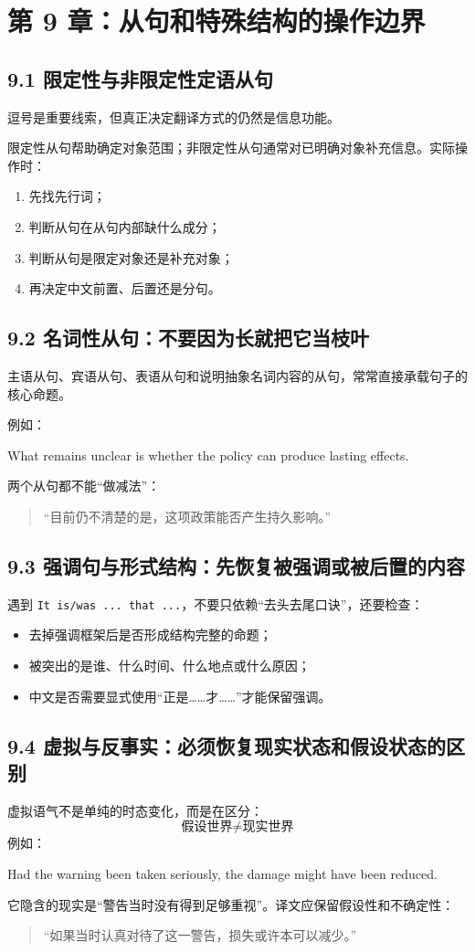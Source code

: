 \documentclass[11pt,a4paper]{ctexart}
\begin{document}
\section{第 9 章：从句和特殊结构的操作边界}

\subsection{9.1 限定性与非限定性定语从句}
逗号是重要线索，但真正决定翻译方式的仍然是信息功能。

限定性从句帮助确定对象范围；非限定性从句通常对已明确对象补充信息。实际操作时：
\begin{enumerate}
  \item 先找先行词；
  \item 判断从句在从句内部缺什么成分；
  \item 判断从句是限定对象还是补充对象；
  \item 再决定中文前置、后置还是分句。
\end{enumerate}

\subsection{9.2 名词性从句：不要因为长就把它当枝叶}
主语从句、宾语从句、表语从句和说明抽象名词内容的从句，常常直接承载句子的核心命题。

例如：
\begin{eng}[例 23]
What remains unclear is whether the policy can produce lasting effects.
\end{eng}
两个从句都不能“做减法”：
\begin{quote}
“目前仍不清楚的是，这项政策能否产生持久影响。”
\end{quote}

\subsection{9.3 强调句与形式结构：先恢复被强调或被后置的内容}
遇到 \texttt{It is/was ... that ...}，不要只依赖“去头去尾口诀”，还要检查：
\begin{itemize}
  \item 去掉强调框架后是否形成结构完整的命题；
  \item 被突出的是谁、什么时间、什么地点或什么原因；
  \item 中文是否需要显式使用“正是……才……”才能保留强调。
\end{itemize}

\subsection{9.4 虚拟与反事实：必须恢复现实状态和假设状态的区别}
虚拟语气不是单纯的时态变化，而是在区分：
\[
\boxed{\text{假设世界} \neq \text{现实世界}}
\]
例如：
\begin{eng}[例 24]
Had the warning been taken seriously, the damage might have been reduced.
\end{eng}
它隐含的现实是“警告当时没有得到足够重视”。译文应保留假设性和不确定性：
\begin{quote}
“如果当时认真对待了这一警告，损失或许本可以减少。”
\end{quote}
\end{document}
